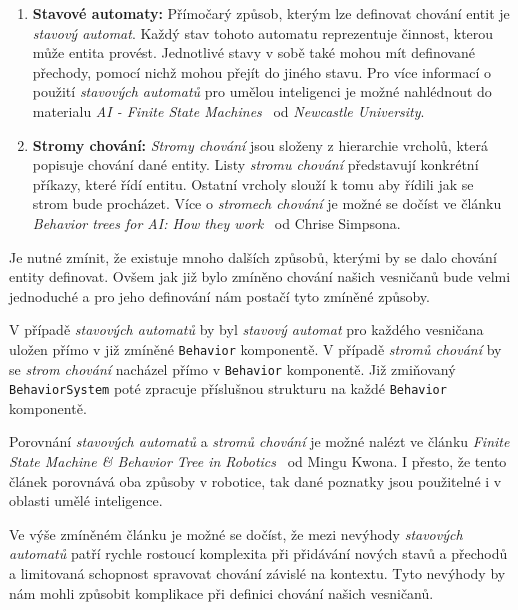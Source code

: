 \begin{enumerate}
    \item \textbf{Stavové automaty:} Přímočarý způsob, kterým lze definovat chování entit je \textit{stavový automat}. Každý stav tohoto automatu reprezentuje činnost, kterou může entita provést. Jednotlivé stavy v sobě také mohou mít definované přechody, pomocí nichž mohou přejít do jiného stavu. Pro více informací o použití \textit{stavových automatů} pro umělou inteligenci je možné nahlédnout do materialu \textit{AI - Finite State Machines}~\cite{AIStateMachines} od \textit{Newcastle University}.
    
    \item \textbf{Stromy chování:} \textit{Stromy chování} jsou složeny z hierarchie vrcholů, která popisuje chování dané entity. Listy \textit{stromu chování} představují konkrétní příkazy, které řídí entitu. Ostatní vrcholy slouží k tomu aby řídili jak se strom bude procházet. Více o \textit{stromech chování} je možné se dočíst ve článku \textit{Behavior trees for AI: How they work}~\cite{BehaviorTrees} od Chrise Simpsona.
\end{enumerate}

Je nutné zmínit, že existuje mnoho dalších způsobů, kterými by se dalo chování entity definovat. Ovšem jak již bylo zmíněno chování našich vesničanů bude velmi jednoduché a pro jeho definování nám postačí tyto zmíněné způsoby.

V případě \textit{stavových automatů} by byl \textit{stavový automat} pro každého vesničana uložen přímo v již zmíněné \texttt{Behavior} komponentě. V případě \textit{stromů chování} by se \textit{strom chování} nacházel přímo v \texttt{Behavior} komponentě. Již zmiňovaný \texttt{BehaviorSystem} poté zpracuje příslušnou strukturu na každé \texttt{Behavior} komponentě.

Porovnání \textit{stavových automatů} a \textit{stromů chování} je možné nalézt ve článku \textit{Finite State Machine \& Behavior Tree in Robotics}~\cite{FMTAndBTInRobotics} od Mingu Kwona. I přesto, že tento článek porovnává oba způsoby v robotice, tak dané poznatky jsou použitelné i v oblasti umělé inteligence.

Ve výše zmíněném článku je možné se dočíst, že mezi nevýhody \textit{stavových automatů} patří rychle rostoucí komplexita při přidávání nových stavů a přechodů a limitovaná schopnost spravovat chování závislé na kontextu. Tyto nevýhody by nám mohli způsobit komplikace při definici chování našich vesničanů.

